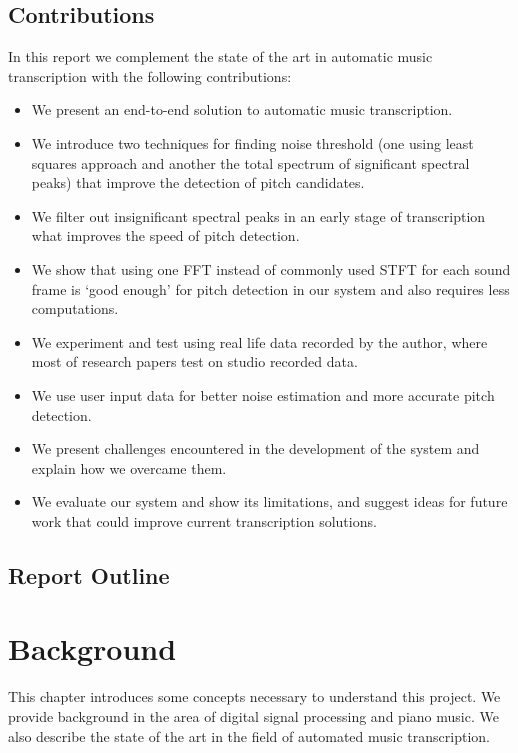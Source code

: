 \documentclass[11pt]{article} %
\begin{document}
\subsection{Contributions}
In this report we complement the state of the art in automatic music transcription with the following contributions:

\begin{itemize}
\item We present an end-to-end solution to automatic music transcription. %
\item We introduce two techniques for finding noise threshold (one using least squares approach and another the total spectrum of significant spectral peaks) that improve the detection of pitch candidates.
\item We filter out insignificant spectral peaks in an early stage of transcription what improves the speed of pitch detection. %
\item We show that using one FFT instead of commonly used STFT for each sound frame is `good enough' for pitch detection in our system and also requires less computations.
\item We experiment and test using real life data recorded by the author, where most of research papers test on studio recorded data.
\item We use user input data for better noise estimation and more accurate pitch detection. %
\item We present challenges encountered in the development of the system and explain how we overcame them.
\item We evaluate our system and show its limitations, and suggest ideas for future work that could improve current transcription solutions.
\end{itemize}

\subsection{Report Outline}
%

\newpage
\section{Background}
This chapter introduces some concepts necessary to understand this project. We provide background in the area of digital signal processing and piano music.
We also describe the state of the art in the field of automated music transcription. 
\end{document}
